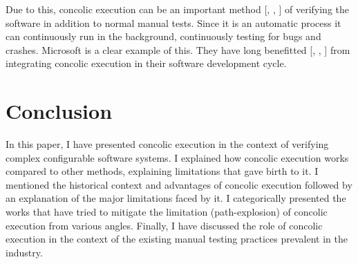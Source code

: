 \documentclass[ runningheads,
               a4paper]{llncs}
\begin{document}
Due to this, concolic execution can be an important method [\cite{fsct2019}, \cite{csallner2008dysy}, \cite{christakis2016guiding}] of verifying the software in addition to normal manual tests. Since it is an automatic process it can continuously run in the background, continuously testing for bugs and crashes. Microsoft is a clear example of this. They have long benefitted [\cite{godefroid2008automated}, \cite{godefroid2012sage}, \cite{bounimova2013billions}] from integrating concolic execution in their software development cycle.




\section{Conclusion}
In this paper, I have presented concolic execution in the context of verifying complex configurable software systems. I explained how concolic execution works compared to other methods, explaining limitations that gave birth to it. I mentioned the historical context and advantages of concolic execution followed by an explanation of the major limitations faced by it. I categorically presented the works that have tried to mitigate the limitation (path-explosion) of concolic execution from various angles. Finally, I have discussed the role of concolic execution in the context of the existing manual testing practices prevalent in the industry.











  
\end{document}
